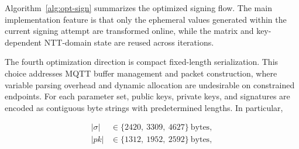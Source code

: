 \documentclass[final, twoside]{IEEEtran} %
\begin{document}
Algorithm~\ref{alg:opt-sign} summarizes the optimized signing flow. The main implementation feature is that only the ephemeral values generated within the current signing attempt are transformed online, while the matrix and key-dependent NTT-domain state are reused across iterations.

\begin{algorithm}[t]
\caption{Cached-Transform ML-DSA Signing Flow}
\label{alg:opt-sign}
\small
{}
\end{algorithm}

The fourth optimization direction is compact fixed-length serialization. This choice addresses MQTT buffer management and packet construction, where variable parsing overhead and dynamic allocation are undesirable on constrained endpoints. For each parameter set, public keys, private keys, and signatures are encoded as contiguous byte strings with predetermined lengths. In particular,

\begin{align}
|\sigma| &\in \{2420,\ 3309,\ 4627\}\ \text{bytes}, \\
|pk| &\in \{1312,\ 1952,\ 2592\}\ \text{bytes},
\label{eq:enc-len}
\end{align}
\end{document}
